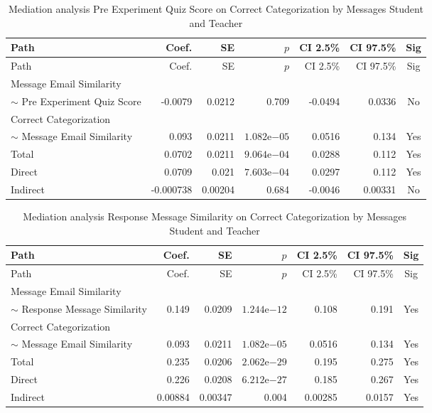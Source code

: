 \begin{longtable}{lrrrrrc}
            \caption{Mediation analysis Pre Experiment Quiz Score on Correct Categorization by  Messages Student and Teacher}\label{tab:mediation Pre Experiment Quiz Score on Correct Categorization by  Messages Student and Teacher}\\
            \toprule
            Path & Coef. & SE & $p$ & CI 2.5\% & CI 97.5\% & Sig \\
            \midrule
            \endfirsthead
            \toprule
            Path & Coef. & SE & $p$ & CI 2.5\% & CI 97.5\% & Sig \\
            \midrule
            \endhead
            \bottomrule
            \endfoot
            Message Email Similarity\\ $\sim$ Pre Experiment Quiz Score & -0.0079 & 0.0212 & 0.709 & -0.0494 & 0.0336 & No \\
Correct Categorization\\ $\sim$ Message Email Similarity & 0.093 & 0.0211 & $1.082\mathrm{e}{-05}$ & 0.0516 & 0.134 & Yes \\
Total & 0.0702 & 0.0211 & $9.064\mathrm{e}{-04}$ & 0.0288 & 0.112 & Yes \\
Direct & 0.0709 & 0.021 & $7.603\mathrm{e}{-04}$ & 0.0297 & 0.112 & Yes \\
Indirect & -0.000738 & 0.00204 & 0.684 & -0.0046 & 0.00331 & No \\
\end{longtable}

\begin{longtable}{lrrrrrc}
            \caption{Mediation analysis Response Message Similarity on Correct Categorization by  Messages Student and Teacher}\label{tab:mediation Response Message Similarity on Correct Categorization by  Messages Student and Teacher}\\
            \toprule
            Path & Coef. & SE & $p$ & CI 2.5\% & CI 97.5\% & Sig \\
            \midrule
            \endfirsthead
            \toprule
            Path & Coef. & SE & $p$ & CI 2.5\% & CI 97.5\% & Sig \\
            \midrule
            \endhead
            \bottomrule
            \endfoot
            Message Email Similarity\\ $\sim$ Response Message Similarity & 0.149 & 0.0209 & $1.244\mathrm{e}{-12}$ & 0.108 & 0.191 & Yes \\
Correct Categorization\\ $\sim$ Message Email Similarity & 0.093 & 0.0211 & $1.082\mathrm{e}{-05}$ & 0.0516 & 0.134 & Yes \\
Total & 0.235 & 0.0206 & $2.062\mathrm{e}{-29}$ & 0.195 & 0.275 & Yes \\
Direct & 0.226 & 0.0208 & $6.212\mathrm{e}{-27}$ & 0.185 & 0.267 & Yes \\
Indirect & 0.00884 & 0.00347 & 0.004 & 0.00285 & 0.0157 & Yes \\
\end{longtable}

